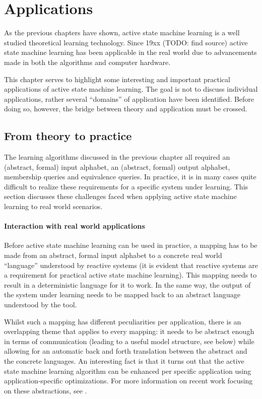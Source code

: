 \documentclass[multi,crop=false,class=article]{standalone}
\begin{document}
\section{Applications}
\label{sec:applications}

As the previous chapters have shown, active state machine learning is a
well studied theoretical learning technology. Since 19xx (TODO: find source)
active state machine learning has been applicable in the real world due to
advancements made in both the algorithms and computer hardware.

This chapter serves to highlight some interesting and important practical
applications of active state machine learning. The goal is not to discuss
individual applications, rather several ``domains'' of application have been
identified. Before doing so, however, the bridge between theory and application
must be crossed.

\subsection{From theory to practice}
\label{sec:theory-to-practice}

The learning algorithms discussed in the previous chapter all required an
(abstract, formal) input alphabet, an (abstract, formal) output alphabet,
membership queries and equivalence queries. In practice, it is in many cases
quite difficult to realize these requirements for a specific system under
learning. This section discusses these challenges faced when applying active
state machine learning to real world scenarios.

\paragraph{Interaction with real world applications} Before active state machine
learning can be used in practice, a mapping has to be made from an abstract,
formal input alphabet to a concrete real world ``language'' understood by
reactive systems (it is evident that reactive systems are a requirement for
practical active state machine learning). This mapping needs to result in a deterministic language for it to
work\cite{Steffen11a}. In the same way, the output of the system under learning
needs to be mapped back to an abstract language understood by the
tool.

Whilst such a mapping has different peculiarities per application, there is an
overlapping theme that applies to every mapping: it needs to be abstract enough
in terms of communication (leading to a useful model structure, see below) while
allowing for an automatic back and forth translation between the abstract and
the concrete languages. An interesting fact is that it turns out that the active
state machine learning algorithm can be enhanced per specific application using
application-specific optimizations. For more information on recent work focusing
on these abstractions, see \cite{Aarts10,Howar11,Jonsson11}.
\end{document}
